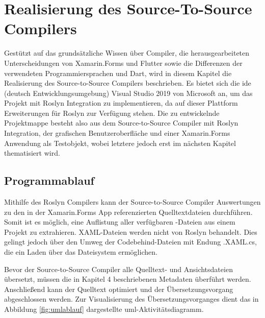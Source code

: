 \chapter{Realisierung des Source-To-Source Compilers}
\label{chap:Realisierung}
Gestützt auf das grundsätzliche Wissen über Compiler, die herausgearbeiteten Unterscheidungen von  Xamarin.Forms und Flutter sowie die Differenzen der verwendeten Programmiersprachen  \Csharp{} und Dart, wird in diesem Kapitel die Realisierung des Source-to-Source Compilers beschrieben.  Es bietet sich die \ac{ide} (deutsch Entwicklungsumgebung) Visual Studio 2019 von Microsoft an,  um das Projekt mit Roslyn Integration zu implementieren,  da auf dieser Plattform Erweiterungen für Roslyn zur Verfügung stehen.
Die zu entwickelnde Projektmappe besteht also aus dem Source-to-Source Compiler mit Roslyn Integration, der grafischen Benutzeroberfläche und einer Xamarin.Forms Anwendung als Testobjekt,  wobei letztere jedoch erst im nächsten Kapitel thematisiert wird.


\section{Programmablauf}
Mithilfe des Roslyn Compilers kann der Source-to-Source Compiler Auswertungen zu den in der Xamarin.Forms App referenzierten Quelltextdateien durchführen.  Somit ist es möglich,  eine Auflistung aller verfügbaren \Csharp-Dateien aus einem Projekt zu extrahieren.  XAML-Dateien werden nicht von Roslyn behandelt.  Dies gelingt jedoch über den Umweg der Codebehind-Dateien mit Endung .XAML.cs,  die ein Laden über das Dateisystem ermöglichen. 

Bevor der Source-to-Source Compiler alle Quelltext- und Ansichtsdateien übersetzt,  müssen die in Kapitel 4 beschriebenen Metadaten überführt werden.  Anschließend kann der Quelltext optimiert und der Übersetzungsvorgang abgeschlossen werden.  Zur Visualisierung des Übersetzungsvorganges dient das in Abbildung \ref{fig:umlablauf} dargestellte \ac{uml}-Aktivitätsdiagramm.

